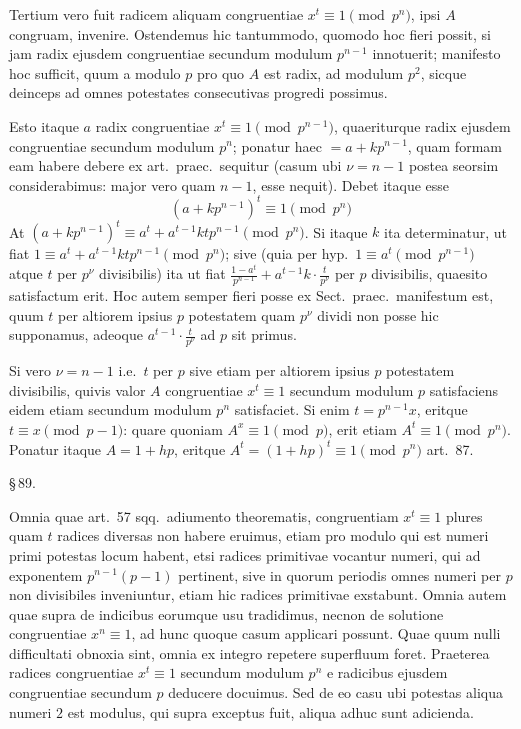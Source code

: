 \documentclass[12pt,a4paper]{article}
\theoremstyle{plain}
\theoremstyle{definition}
\theoremstyle{remark}
\begin{document}
Tertium vero fuit radicem aliquam congruentiae $x^t \equiv 1 \pmod{p^n}$, ipsi $A$ congruam, invenire. Ostendemus hic tantummodo, quomodo hoc fieri possit, si jam radix ejusdem congruentiae secundum modulum $p^{n-1}$ innotuerit; manifesto hoc sufficit, quum a modulo $p$ pro quo $A$ est radix, ad modulum $p^2$, sicque deinceps ad omnes potestates consecutivas progredi possimus.

Esto itaque $a$ radix congruentiae $x^t \equiv 1 \pmod{p^{n-1}}$, quaeriturque radix ejusdem congruentiae secundum modulum $p^n$; ponatur haec $= a + kp^{n-1}$, quam formam eam habere debere ex art.\ praec.\ sequitur (casum ubi $\nu = n-1$ postea seorsim considerabimus: major vero quam $n-1$, esse nequit). Debet itaque esse
\[
(a + kp^{n-1})^t \equiv 1 \pmod{p^n}
\]
At $(a + kp^{n-1})^t \equiv a^t + a^{t-1}ktp^{n-1} \pmod{p^n}$. Si itaque $k$ ita determinatur, ut fiat $1 \equiv a^t + a^{t-1}ktp^{n-1} \pmod{p^n}$; sive (quia per hyp.\ $1 \equiv a^t \pmod{p^{n-1}}$ atque $t$ per $p^\nu$ divisibilis) ita ut fiat $\frac{1-a^t}{p^{n-1}} + a^{t-1}k \cdot \frac{t}{p^\nu}$ per $p$ divisibilis, quaesito satisfactum erit. Hoc autem semper fieri posse ex Sect.\ praec.\ manifestum est, quum $t$ per altiorem ipsius $p$ potestatem quam $p^\nu$ dividi non posse hic supponamus, adeoque $a^{t-1} \cdot \frac{t}{p^\nu}$ ad $p$ sit primus.

Si vero $\nu = n-1$ i.e.\ $t$ per $p$ sive etiam per altiorem ipsius $p$ potestatem divisibilis, quivis valor $A$ congruentiae $x^t \equiv 1$ secundum modulum $p$ satisfaciens eidem etiam secundum modulum $p^n$ satisfaciet. Si enim $t = p^{n-1}x$, eritque $t \equiv x \pmod{p-1}$: quare quoniam $A^x \equiv 1 \pmod{p}$, erit etiam $A^t \equiv 1 \pmod{p^n}$. Ponatur itaque $A = 1 + hp$, eritque $A^t = (1 + hp)^t \equiv 1 \pmod{p^n}$ art.~87.

\begin{center}\S\,89.\end{center}

Omnia quae art.~57 sqq.\ adiumento theorematis, congruentiam $x^t \equiv 1$ plures quam $t$ radices diversas non habere eruimus, etiam pro modulo qui est numeri primi potestas locum habent, etsi radices primitivae vocantur numeri, qui ad exponentem $p^{n-1}(p-1)$ pertinent, sive in quorum periodis omnes numeri per $p$ non divisibiles inveniuntur, etiam hic radices primitivae exstabunt. Omnia autem quae supra de indicibus eorumque usu tradidimus, necnon de solutione congruentiae $x^n \equiv 1$, ad hunc quoque casum applicari possunt. Quae quum nulli difficultati obnoxia sint, omnia ex integro repetere superfluum foret. Praeterea radices congruentiae $x^t \equiv 1$ secundum modulum $p^n$ e radicibus ejusdem congruentiae secundum $p$ deducere docuimus. Sed de eo casu ubi potestas aliqua numeri $2$ est modulus, qui supra exceptus fuit, aliqua adhuc sunt adicienda.
\end{document}
